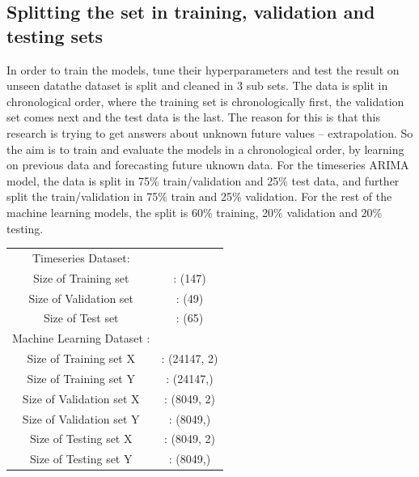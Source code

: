 \documentclass[a4paper, twocolumn]{article}
\begin{document}
\subsection{Splitting the set in training, validation and testing sets}\label{split}
In order to train the models, tune their hyperparameters and test the result on unseen datathe dataset is split and cleaned in 3 sub sets.
The data is split in chronological order, where the training set is chronologically first, the validation set comes next and the test data is the last. 
The reason for this is that this research is trying to get answers about unknown future values – extrapolation. 
So the aim is to train and evaluate the models in a chronological order, by learning on previous data and forecasting future uknown data. 
For the timeseries ARIMA model, the data is split in 75\% train/validation and 25\% test data, and further split the train/validation in 75\% train and 25\% validation. 
For the rest of the machine learning models, the split is 60\% training, 20\% validation and 20\% testing.

\begin{flushleft}
    \begin{tabular}{ c c }
        Timeseries Dataset:\\
        Size of Training set &    : (147)\\
        Size of Validation set &  : (49)\\
        Size of Test set &        : (65)\\
        Machine Learning Dataset  :\\
        Size of Training set X &  : (24147, 2)\\
        Size of Training set Y&   : (24147,)\\
        Size of Validation set X &: (8049, 2)\\
        Size of Validation set Y& : (8049,)\\
        Size of Testing set X &   : (8049, 2)\\
        Size of Testing set Y&    : (8049,)\\

    \end{tabular}
\end{flushleft}
\end{document}
